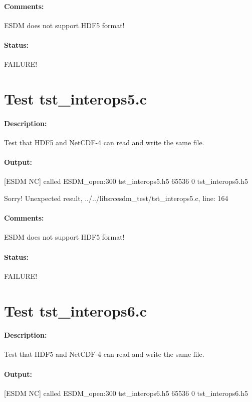 \paragraph{Comments:} ESDM does not support HDF5 format!

\paragraph{Status:} FAILURE!

\section{Test tst\_interops5.c}

\paragraph{Description:} Test that HDF5 and NetCDF-4 can read and write the same file.

\paragraph{Output:} [ESDM NC] called ESDM\_open:300 tst\_interops5.h5 65536 0 tst\_interops5.h5

Sorry! Unexpected result, ../../libsrcesdm\_test/tst\_interops5.c, line: 164

\paragraph{Comments:} ESDM does not support HDF5 format!

\paragraph{Status:} FAILURE!

\section{Test tst\_interops6.c}

\paragraph{Description:} Test that HDF5 and NetCDF-4 can read and write the same file.

\paragraph{Output:} [ESDM NC] called ESDM\_open:300 tst\_interops6.h5 65536 0 tst\_interops6.h5

